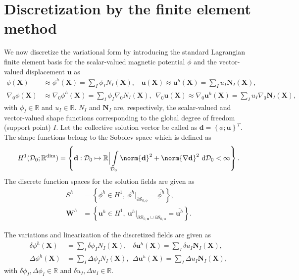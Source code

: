 \section{Discretization by the finite element method}
We now discretize the variational form  by introducing the standard Lagrangian finite element basis for the scalar-valued magnetic potential $\phi$ and the vector-valued displacement $\mathbf{u}$ as
\begin{align}
\phi (\mathbf{X}) &\approx \phi^h (\mathbf{X}) = \sum\limits_{I} \phi_I N_I (\mathbf{X}), \ \ \ \ \mathbf{u} (\mathbf{X}) \approx \mathbf{u}^h (\mathbf{X}) = \sum\limits_{I} u_I \mathbf{N}_I (\mathbf{X}), \\
\nabla_0 \phi (\mathbf{X}) &\approx \nabla_0 \phi^h (\mathbf{X}) = \sum\limits_{I} \phi_I \nabla_0 N_I (\mathbf{X}), \ \ \nabla_0 \mathbf{u} (\mathbf{X}) \approx \nabla_0 \mathbf{u}^h (\mathbf{X}) = \sum\limits_{I} u_I \nabla_0 \mathbf{N}_I (\mathbf{X}),
\end{align}
with $\phi_I \in \mathbb{R}$ and $u_I \in \mathbb{R}$. $N_I$ and $\mathbf{N}_I$ are, respectively, the scalar-valued and vector-valued shape functions corresponding to the global degree of freedom (support point) $I$. Let the collective solution vector be called as $\mathbf{d} = \left\lbrace \phi; \mathbf{u} \right\rbrace^T$. The shape functions belong to the Sobolev space which is defined as
\begin{equation}
H^1 (\mathcal{D}_0; \mathbb{R}^{\text{dim}}) = \left\lbrace \mathbf{d} : \mathcal{D}_0 \mapsto \mathbb{R} \Big{|} \int\limits_{\mathcal{D}_0} \norm{\mathbf{d}}^2 + \norm{\nabla \mathbf{d}}^2 \ \mathrm{d}\mathcal{D}_0 < \infty \right\rbrace.
\end{equation}
The discrete function spaces for the solution fields are given as
\begin{align}
S^h &= \left\lbrace \phi^h \in H^1, \ \phi^h|_{\partial \mathcal{S}_{0, \phi}} = \overline{\phi^h} \right\rbrace, \\
\mathbf{W}^h &= \left\lbrace \mathbf{u}^h \in H^1, \ \mathbf{u}^h|_{\partial \mathcal{B}_{0, \mathbf{u}} \cup \partial \mathcal{S}_{0, \mathbf{u}}} = \overline{\mathbf{u}^h} \right\rbrace.
\end{align}

\noindent The variations and linearization of the discretized fields are given as
\begin{align}
\delta \phi^h (\mathbf{X}) &= \sum\limits_{I} \delta \phi_I N_I (\mathbf{X}), \ \ \ \ \delta  \mathbf{u}^h (\mathbf{X}) = \sum\limits_{I} \delta u_I \mathbf{N}_I (\mathbf{X}), \\
\Delta \phi^h (\mathbf{X}) &= \sum\limits_{I} \Delta \phi_I N_I (\mathbf{X}), \ \ \Delta \mathbf{u}^h (\mathbf{X}) = \sum\limits_{I} \Delta u_I \mathbf{N}_I (\mathbf{X}),
\end{align}
with $\delta \phi_I, \Delta \phi_I \in \mathbb{R}$ and $\delta u_I, \Delta u_I \in \mathbb{R}$. \par 

